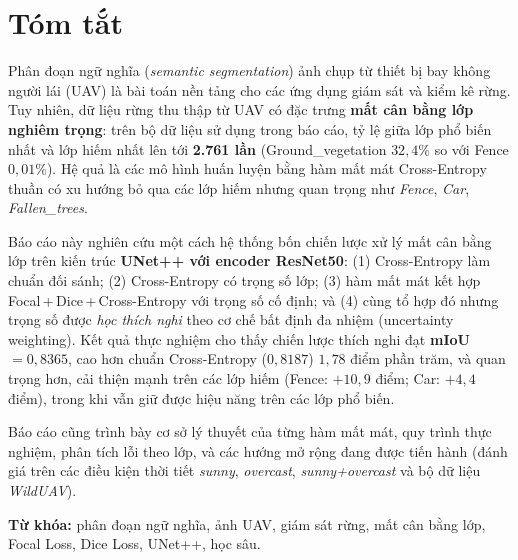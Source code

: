 \chapter*{Tóm tắt}

Phân đoạn ngữ nghĩa (\textit{semantic segmentation}) ảnh chụp từ thiết bị bay
không người lái (UAV) là bài toán nền tảng cho các ứng dụng giám sát và kiểm kê
rừng. Tuy nhiên, dữ liệu rừng thu thập từ UAV có đặc trưng \textbf{mất cân bằng
lớp nghiêm trọng}: trên bộ dữ liệu sử dụng trong báo cáo, tỷ lệ giữa lớp phổ biến
nhất và lớp hiếm nhất lên tới \textbf{2.761 lần} (Ground\_vegetation $32{,}4\%$ so
với Fence $0{,}01\%$). Hệ quả là các mô hình huấn luyện bằng hàm mất mát
Cross-Entropy thuần có xu hướng bỏ qua các lớp hiếm nhưng quan trọng như
\textit{Fence}, \textit{Car}, \textit{Fallen\_trees}.

Báo cáo này nghiên cứu một cách hệ thống bốn chiến lược xử lý mất cân bằng lớp
trên kiến trúc \textbf{UNet++ với encoder ResNet50}: (1) Cross-Entropy làm chuẩn
đối sánh; (2) Cross-Entropy có trọng số lớp; (3) hàm mất mát kết hợp
Focal\,+\,Dice\,+\,Cross-Entropy với trọng số cố định; và (4) cùng tổ hợp đó nhưng
trọng số được \textit{học thích nghi} theo cơ chế bất định đa nhiệm (uncertainty
weighting). Kết quả thực nghiệm cho thấy chiến lược thích nghi đạt
\textbf{mIoU $= 0{,}8365$}, cao hơn chuẩn Cross-Entropy ($0{,}8187$) $1{,}78$ điểm
phần trăm, và quan trọng hơn, cải thiện mạnh trên các lớp hiếm
(Fence: $+10{,}9$ điểm; Car: $+4{,}4$ điểm), trong khi vẫn giữ được hiệu năng trên
các lớp phổ biến.

Báo cáo cũng trình bày cơ sở lý thuyết của từng hàm mất mát, quy trình thực nghiệm,
phân tích lỗi theo lớp, và các hướng mở rộng đang được tiến hành (đánh giá trên các
điều kiện thời tiết \textit{sunny}, \textit{overcast}, \textit{sunny+overcast} và bộ
dữ liệu \textit{WildUAV}).

\vspace{0.5cm}
\noindent\textbf{Từ khóa:} phân đoạn ngữ nghĩa, ảnh UAV, giám sát rừng, mất cân bằng
lớp, Focal Loss, Dice Loss, UNet++, học sâu.

